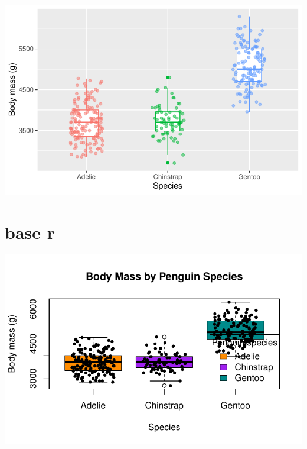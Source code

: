 \documentclass[
  letterpaper,
  DIV=11,
  numbers=noendperiod]{scrreprt}
\begin{document}
\includegraphics{scripts/02_dataViz/class4_files/figure-pdf/unnamed-chunk-5-1.pdf}

\section{base r}

\includegraphics{scripts/02_dataViz/class4_files/figure-pdf/unnamed-chunk-6-1.pdf}
\end{document}
